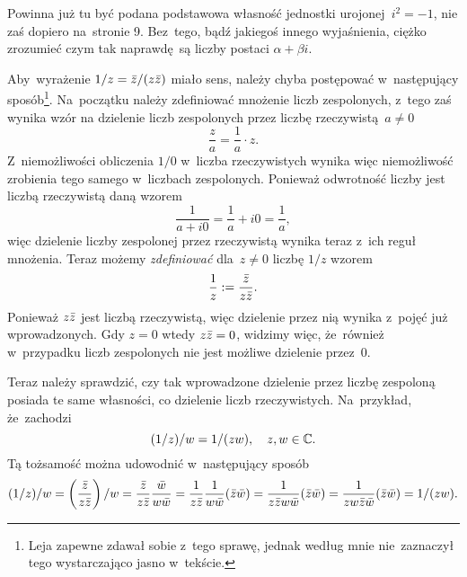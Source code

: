 \documentclass[a4paper,11pt]{article}
\begin{document}
\noindent
{} Powinna już tu być podana podstawowa własność jednostki
urojonej~$i^{ 2 } = -1$, nie zaś dopiero na~stronie 9. Bez~tego, bądź
jakiegoś innego wyjaśnienia, ciężko zrozumieć czym tak naprawdę~są
liczby postaci $\alpha + \beta i$.

\vspace{\spaceFour}





\noindent
{} Aby~wyrażenie $1 / z = \bar{z} / ( z \bar{z} )$ miało sens, należy
chyba postępować w~następujący sposób\footnote{Leja zapewne zdawał sobie
  z~tego sprawę, jednak według mnie nie~zaznaczył tego wystarczająco jasno
  w~tekście.}. Na~początku należy zdefiniować mnożenie liczb zespolonych,
z~tego zaś wynika wzór na dzielenie liczb zespolonych przez liczbę
rzeczywistą~$a \neq 0$
\begin{equation}
  \label{eq:Leja-Funkcje-zespolone-02}
  \frac{ z }{ a } = \frac{ 1 }{ a } \cdot z.
\end{equation}
Z~niemożliwości obliczenia $1 / 0$ w~liczba rzeczywistych wynika więc
niemożliwość zrobienia tego samego w~liczbach zespolonych. Ponieważ
odwrotność liczby jest liczbą rzeczywistą daną wzorem
\begin{equation}
  \label{eq:Leja-Funkcje-zespolone-03}
  \frac{ 1 }{ a + i0 } = \frac{ 1 }{ a } + i0
  = \frac{ 1 }{ a },
\end{equation}
więc dzielenie liczby zespolonej przez rzeczywistą wynika teraz z~ich
reguł mnożenia. Teraz możemy \textit{zdefiniować} dla~$z \neq 0$
liczbę $1 / z$ wzorem
\begin{equation}
  \label{eq:Leja-Funkcje-zespolone-04}
  \frac{ 1 }{ z } := \frac{ \bar{z} }{ z \bar{z} }.
\end{equation}
Ponieważ $z \bar{z}$ jest liczbą rzeczywistą, więc dzielenie przez nią
wynika z~pojęć już wprowadzonych. Gdy $z = 0$ wtedy $z \bar{z} = 0$,
widzimy więc, że~również w~przypadku liczb zespolonych nie jest
możliwe dzielenie przez~0.

Teraz należy sprawdzić, czy tak wprowadzone dzielenie przez liczbę
zespoloną posiada te same własności, co dzielenie liczb rzeczywistych.
Na~przykład, że~zachodzi
\begin{equation}
  \label{eq:Leja-Funkcje-zespolone-05}
  ( 1 / z ) / w = 1 / ( z w ), \quad z, w \in \mathbb{C}.
\end{equation}
Tą tożsamość można udowodnić w~następujący sposób
\begin{equation}
  \label{eq:Leja-Funkcje-zespolone-06}
    ( 1 / z ) / w =
    \left( \frac{ \bar{z} }{ z \bar{z} } \right) / w =
    \frac{ \bar{z} }{ z \bar{z} } \frac{ \bar{w} }{ w \bar{w} } =
    \frac{ 1 }{ z \bar{z} } \frac{ 1 }{ w \bar{w} } ( \bar{z} \bar{w} ) =
    \frac{ 1 }{ z \bar{z} w \bar{w} } ( \bar{z} \bar{w} ) =
    \frac{ 1 }{ z w \bar{z} \bar{w} } ( \bar{z} \bar{w} ) =
    1 / ( z w ).
\end{equation}
\end{document}
